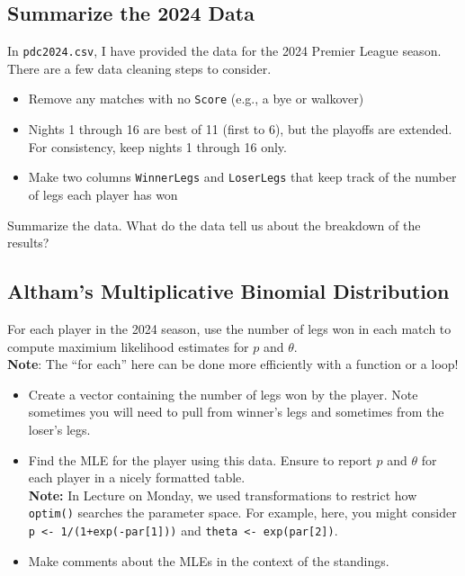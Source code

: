 \documentclass[
]{article}
\providecommand{\tightlist}{%
  \setlength{\itemsep}{0pt}\setlength{\parskip}{0pt}}
\begin{document}
\subsection{Summarize the 2024 Data}\label{summarize-the-2024-data}

In \texttt{pdc2024.csv}, I have provided the data for the 2024 Premier
League season. There are a few data cleaning steps to consider.

\begin{itemize}
\tightlist
\item
  Remove any matches with no \texttt{Score} (e.g., a bye or walkover)
\item
  Nights 1 through 16 are best of 11 (first to 6), but the playoffs are
  extended. For consistency, keep nights 1 through 16 only.
\item
  Make two columns \texttt{WinnerLegs} and \texttt{LoserLegs} that keep
  track of the number of legs each player has won
\end{itemize}

Summarize the data. What do the data tell us about the breakdown of the
results?

\subsection{Altham's Multiplicative Binomial
Distribution}\label{althams-multiplicative-binomial-distribution-1}

For each player in the 2024 season, use the number of legs won in each
match to compute maximium likelihood estimates for \(p\) and
\(\theta\).\\
\textbf{Note}: The ``for each'' here can be done more efficiently with a
function or a loop!

\begin{itemize}
\tightlist
\item
  Create a vector containing the number of legs won by the player. Note
  sometimes you will need to pull from winner's legs and sometimes from
  the loser's legs.
\item
  Find the MLE for the player using this data. Ensure to report \(p\)
  and \(\theta\) for each player in a nicely formatted table.\\
  \textbf{Note:} In Lecture on Monday, we used transformations to
  restrict how \texttt{optim()} searches the parameter space. For
  example, here, you might consider
  \texttt{p\ \textless{}-\ 1/(1+exp(-par{[}1{]}))} and
  \texttt{theta\ \textless{}-\ exp(par{[}2{]})}.
\item
  Make comments about the MLEs in the context of the standings.
\end{itemize}
\end{document}
